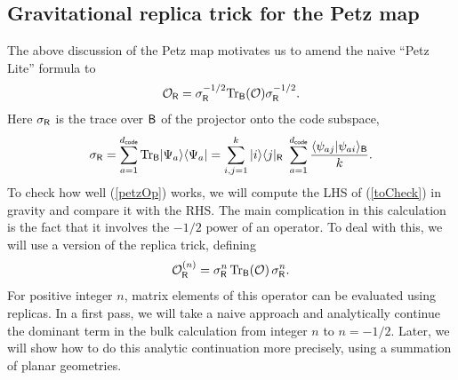 \documentclass[11pt]{article}
\newcommand{\be}{\begin{equation}}
\newcommand{\ee}{\end{equation}}
\numberwithin{equation}{section}
\def\tr{\text{Tr}}
\begin{document}
\subsection{Gravitational replica trick for the Petz map}\label{sec:gravPetz}
The above discussion of the Petz map motivates us to amend the naive ``Petz Lite'' formula to
\be
\mathcal{O}_{\sf{R}} = \sigma_{\sf{R}}^{-1/2}\tr_{\sf{B}}(\mathcal{O})\sigma_{\sf{R}}^{-1/2}.\label{petzOp}
\ee
Here $\sigma_{\sf{R}}$ is the trace over $\sf{B}$ of the projector onto the code subspace,
\be
\sigma_{\sf{R}} = \sum_{a = 1}^{d_{\sf{code}}}\tr_{\sf{B}} |\Psi_a\rangle\langle \Psi_a| = \sum_{i,j = 1}^k|i\rangle\langle j|_{\sf{R}} \ \sum_{a = 1}^{d_{\sf{code}}}\frac{\langle\psi_{aj}|\psi_{ai}\rangle_{\sf{B}}}{k}.
\ee
To check how well (\ref{petzOp}) works, we will compute the LHS of (\ref{toCheck}) in gravity and compare it with the RHS. The main complication in this calculation is the fact that it involves the $-1/2$ power of an operator. To deal with this, we will use a version of the replica trick, defining
\be
\mathcal{O}^{(n)}_{\sf{R}} = \sigma_{\sf{R}}^{n}\,\tr_{\sf{B}}(\mathcal{O})\,\sigma_{\sf{R}}^{n}.\label{sigmaR}
\ee
For positive integer $n$, matrix elements of this operator can be evaluated using replicas. In a first pass, we will take a naive approach and analytically continue the dominant term in the bulk calculation from integer $n$ to $n = -1/2$. Later, we will show how to do this analytic continuation more precisely, using a summation of planar geometries.
\end{document}
